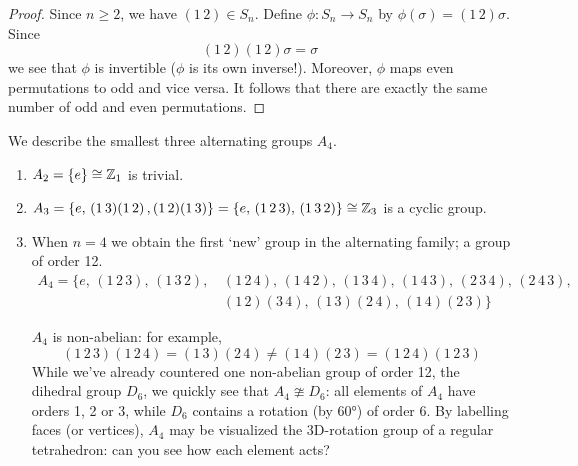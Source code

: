 \begin{proof}
	Since $n\ge 2$, we have $(1\,2)\in S_n$. Define $\phi:S_n\to S_n$ by $\phi(\sigma)=(1\,2)\sigma$. Since
	\[
		(1\,2)(1\,2)\sigma=\sigma
	\]
	we see that $\phi$ is invertible ($\phi$ is its own inverse!). Moreover, $\phi$ maps even permutations to odd and vice versa. It follows that there are exactly the same number of odd and even permutations.
\end{proof}

\begin{examples}{}{}
	We describe the smallest three alternating groups $A_4$.
	\begin{enumerate}
	  \item $A_2=\{e\}\cong \mathbb{Z}_1$ is trivial.
	  \item $A_3=\{e,\,(1\,3)(1\,2)\,,(1\,2)(1\,3)\}=\{e,\,(1\,2\,3),\,(1\,3\,2)\}\cong\mathbb{Z}_3$ is a cyclic group.
	  \item\label{pg:tetra} When $n=4$ we obtain the first `new' group in the alternating family; a group of order 12.
	  \begin{align*}
	  	A_4=\{e,\,(1\,2\,3),\,(1\,3\,2),\,&(1\,2\,4),\,(1\,4\,2),\,(1\,3\,4),\,(1\,4\,3),\,(2\,3\,4),\,(2\,4\,3),\\
	  	&(1\,2)(3\,4),\,(1\,3)(2\,4),\,(1\,4)(2\,3)\}
	  \end{align*}
	  \begin{minipage}[t]{0.69\linewidth}\vspace{0pt}
	    $A_4$ is non-abelian: for example,
	  	\[
	  		(1\,2\,3)(1\,2\,4)=(1\,3)(2\,4)\neq (1\,4)(2\,3)=(1\,2\,4)(1\,2\,3)
	  	\]
	  	While we've already countered one non-abelian group of order 12, the dihedral group $D_6$, we quickly see that $A_4\ncong D_6$: all elements of $A_4$ have orders 1, 2 or 3, while $D_6$ contains a rotation (by $\ang{60}$) of order 6.\smallbreak
	  By labelling faces (or vertices), $A_4$ may be visualized the 3D-rotation group of a regular tetrahedron: can you see how each element acts?
	  \end{minipage}
	  \hfill
	  \begin{minipage}[t]{0.3\linewidth}\vspace{0pt}

\end{minipage}
\end{enumerate}
\end{examples}
